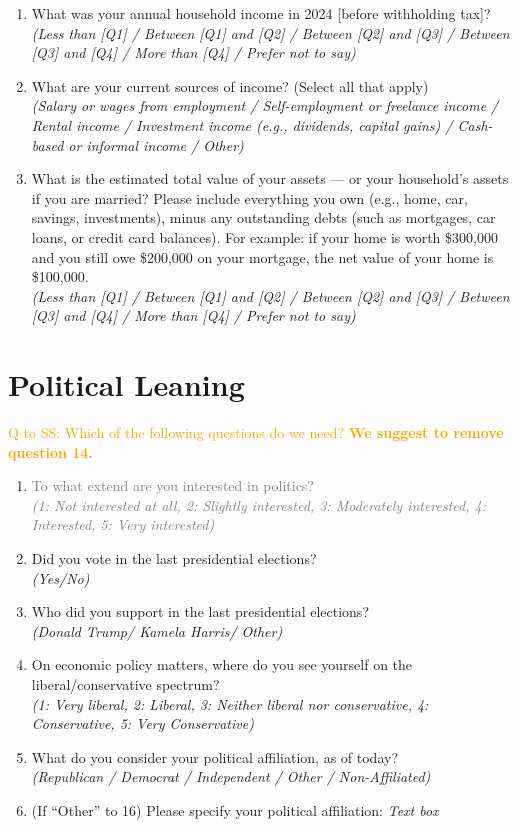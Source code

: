 \documentclass[11pt]{article}
\newcommand{\tk}[1]{\textcolor{orange}{#1}}
\begin{document}
\begin{enumerate}
    \item What was your annual household income in 2024 [before withholding tax]?\\ 
    \textit{(Less than [Q1] / Between [Q1] and [Q2] / Between [Q2] and [Q3] / Between [Q3] and [Q4] / More than [Q4] / Prefer not to say)}
    \item What are your current sources of income? (Select all that apply)\\
    \textit{(Salary or wages from employment / Self-employment or freelance income / Rental income / Investment income (e.g., dividends, capital gains) / Cash-based or informal income / Other)}
    \item What is the estimated total value of your assets — or your household’s assets if you are married? Please include everything you own (e.g., home, car, savings, investments), minus any outstanding debts (such as mortgages, car loans, or credit card balances). For example: if your home is worth \$300,000 and you still owe \$200,000 on your mortgage, the net value of your home is \$100,000.\\
    \textit{(Less than [Q1] / Between [Q1] and [Q2] / Between [Q2] and [Q3] / Between [Q3] and [Q4] / More than [Q4] / Prefer not to say)}
\end{enumerate}
\section*{Political Leaning}
\tk{Q to SS: Which of the following questions do we need? \textbf{We suggest to remove question 14.}}
\begin{enumerate}[resume]
    \item[\sout{\theenumi.}] \textcolor{gray}{To what extend are you interested in politics?\\ \textit{(1: Not interested at all, 2: Slightly interested, 3: Moderately interested, 4: Interested, 5: Very interested)}}
    \item Did you vote in the last presidential elections? \\\textit{(Yes/No)} 
    \item Who did you support in the last presidential elections? \\ \textit{(Donald Trump/ Kamela Harris/ Other)}
    \item On economic policy matters, where do you see yourself on the liberal/conservative spectrum? \\\textit{(1: Very liberal, 2: Liberal, 3: Neither liberal nor conservative, 4: Conservative, 5: Very Conservative)}
    \item What do you consider your political affiliation, as of today? \\
    \textit{(Republican / Democrat / Independent / Other / Non-Affiliated)} \\
    \item (If “Other” to 16) Please specify your political affiliation: \textit{Text box}
\end{enumerate}
\end{document}
